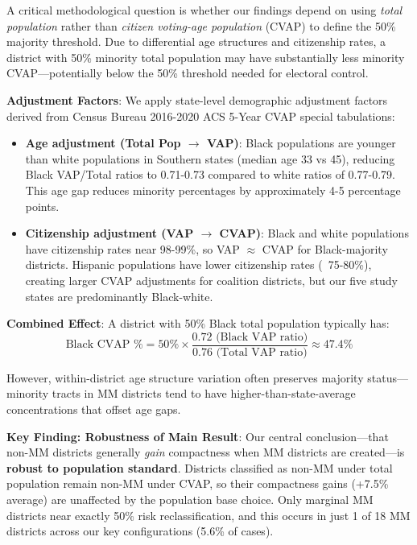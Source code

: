 A critical methodological question is whether our findings depend on using \emph{total population} rather than \emph{citizen voting-age population} (CVAP) to define the 50\% majority threshold. Due to differential age structures and citizenship rates, a district with 50\% minority total population may have substantially less minority CVAP---potentially below the 50\% threshold needed for electoral control.

\textbf{Adjustment Factors}: We apply state-level demographic adjustment factors derived from Census Bureau 2016-2020 ACS 5-Year CVAP special tabulations:

\begin{itemize}
    \item \textbf{Age adjustment (Total Pop $\to$ VAP)}: Black populations are younger than white populations in Southern states (median age 33 vs 45), reducing Black VAP/Total ratios to 0.71-0.73 compared to white ratios of 0.77-0.79. This age gap reduces minority percentages by approximately 4-5 percentage points.

    \item \textbf{Citizenship adjustment (VAP $\to$ CVAP)}: Black and white populations have citizenship rates near 98-99\%, so VAP $\approx$ CVAP for Black-majority districts. Hispanic populations have lower citizenship rates (~75-80\%), creating larger CVAP adjustments for coalition districts, but our five study states are predominantly Black-white.
\end{itemize}

\textbf{Combined Effect}: A district with 50\% Black total population typically has:
\[
\text{Black CVAP \%} = 50\% \times \frac{0.72 \text{ (Black VAP ratio)}}{0.76 \text{ (Total VAP ratio)}} \approx 47.4\%
\]

However, within-district age structure variation often preserves majority status---minority tracts in MM districts tend to have higher-than-state-average concentrations that offset age gaps.



\textbf{Key Finding: Robustness of Main Result}: Our central conclusion---that non-MM districts generally \emph{gain} compactness when MM districts are created---is \textbf{robust to population standard}. Districts classified as non-MM under total population remain non-MM under CVAP, so their compactness gains (+7.5\% average) are unaffected by the population base choice. Only marginal MM districts near exactly 50\% risk reclassification, and this occurs in just 1 of 18 MM districts across our key configurations (5.6\% of cases).

